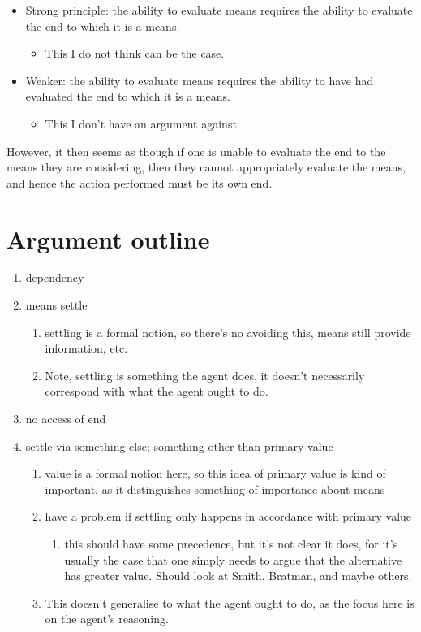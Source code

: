 \documentclass[10pt]{article}
\begin{document}
\begin{itemize}
\item Strong principle: the ability to evaluate means requires the ability to evaluate the end to which it is a means.
  \begin{itemize}
  \item This I do not think can be the case.
  \end{itemize}
\item Weaker: the ability to evaluate means requires the ability to have had evaluated the end to which it is a means.
  \begin{itemize}
  \item This I don't have an argument against.
  \end{itemize}
\end{itemize}


However, it then seems as though if one is unable to evaluate the end to the means they are considering, then they cannot appropriately evaluate the means, and hence the action performed must be its own end.

\section{Argument outline}
\label{sec:argument-outline}

\begin{enumerate}
\item dependency
\item means settle
  \begin{enumerate}
  \item settling is a formal notion, so there's no avoiding this, means still provide information, etc.
  \item Note, settling is something the agent does, it doesn't necessarily correspond with what the agent ought to do.
  \end{enumerate}
\item no access of end
\item settle via something else; something other than primary value
  \begin{enumerate}
  \item value is a formal notion here, so this idea of primary value is kind of important, as it distinguishes something of importance about means
  \item have a problem if settling only happens in accordance with primary value
    \begin{enumerate}
    \item this should have some precedence, but it's not clear it does, for it's usually the case that one simply needs to argue that the alternative has greater value.
      Should look at Smith, Bratman, and maybe others.
    \end{enumerate}
  \item This doesn't generalise to what the agent ought to do, as the focus here is on the agent's reasoning.
  \end{enumerate}
\end{enumerate}
\end{document}
